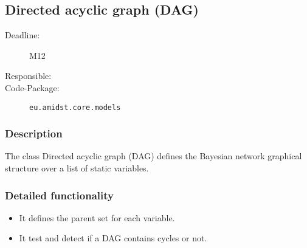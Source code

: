 \subsection{Directed acyclic graph (DAG)}
\label{DAG:ID}

\begin{description}
\item[Deadline:] M12
\item[Responsible:]
\item[Code-Package:] \texttt{eu.amidst.core.models}
\end{description}


\subsubsection*{Description}

The class Directed acyclic graph (DAG) defines the Bayesian network graphical structure over a list of static variables.

\subsubsection*{Detailed functionality}

\begin{itemize}
\item It defines the parent set for each variable.
\item It test and detect if a DAG contains cycles or not.
\end{itemize}